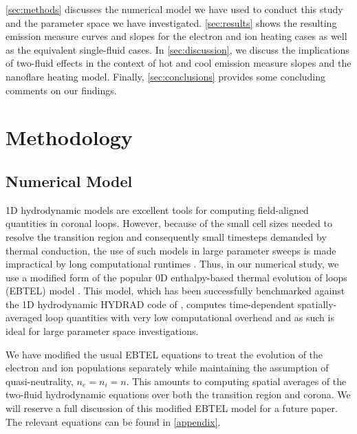 \documentclass[apj]{emulateapj}
\begin{document}
	\par\autoref{sec:methods} discusses the numerical model we have used to conduct this study and the parameter space we have investigated. \autoref{sec:results} shows the resulting emission measure curves and slopes for the electron and ion heating cases as well as the equivalent single-fluid cases. In \autoref{sec:discussion}, we discuss the implications of two-fluid effects in the context of hot and cool emission measure slopes and the nanoflare heating model. Finally, \autoref{sec:conclusions} provides some concluding comments on our findings.
	\section{Methodology}
	\label{sec:methods}
	\subsection{Numerical Model}
	\label{subsec:numerics}
	\par 1D hydrodynamic models are excellent tools for computing field-aligned quantities in coronal loops. However, because of the small cell sizes needed to resolve the transition region and consequently small timesteps demanded by thermal conduction, the use of such models in large parameter sweeps is made impractical by long computational runtimes \citep{bradshaw_influence_2013}. Thus, in our numerical study, we use a modified form of the popular 0D enthalpy-based thermal evolution of loops (EBTEL) model \citep{klimchuk_highly_2008,cargill_enthalpy-based_2012,cargill_enthalpy-based_2012-1,cargill_modelling_2015}. This model, which has been successfully benchmarked against the 1D hydrodynamic HYDRAD code of \citet{bradshaw_influence_2013}, computes time-dependent spatially-averaged loop quantities with very low computational overhead and as such is ideal for large parameter space investigations. 
	\par We have modified the usual EBTEL equations \citep[see][]{cargill_enthalpy-based_2012} to treat the evolution of the electron and ion populations separately while maintaining the assumption of quasi-neutrality, $n_e=n_i=n$. This amounts to computing spatial averages of the two-fluid hydrodynamic equations over both the transition region and corona. We will reserve a full discussion of this modified EBTEL model for a future paper. The relevant equations can be found in \autoref{appendix}.  
\end{document}
